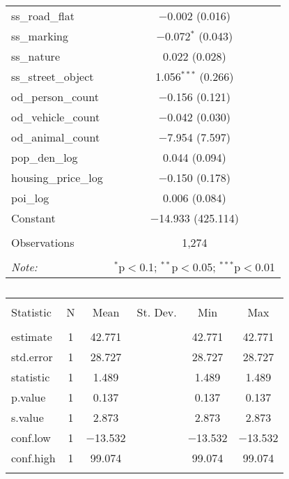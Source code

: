\begin{table}[!htbp]
\begin{tabular}{@{\extracolsep{1pt}}lc}
  ss\_road\_flat & $-$0.002 (0.016) \\ 
  ss\_marking & $-$0.072$^{*}$ (0.043) \\ 
  ss\_nature & 0.022 (0.028) \\ 
  ss\_street\_object & 1.056$^{***}$ (0.266) \\ 
  od\_person\_count & $-$0.156 (0.121) \\ 
  od\_vehicle\_count & $-$0.042 (0.030) \\ 
  od\_animal\_count & $-$7.954 (7.597) \\ 
  pop\_den\_log & 0.044 (0.094) \\ 
  housing\_price\_log & $-$0.150 (0.178) \\ 
  poi\_log & 0.006 (0.084) \\ 
  Constant & $-$14.933 (425.114) \\ 
 \hline \\[-1.8ex] 
Observations & 1,274 \\ 
\hline 
\hline \\[-1.8ex] 
\textit{Note:}  & \multicolumn{1}{r}{$^{*}$p$<$0.1; $^{**}$p$<$0.05; $^{***}$p$<$0.01} \\ 
\end{tabular} 
\end{table} 

\begin{table}[!htbp] \centering 
  \caption{} 
  \label{} 
\small 
\begin{tabular}{@{\extracolsep{1pt}}lccccc} 
\\[-1.8ex]\hline 
\hline \\[-1.8ex] 
Statistic & \multicolumn{1}{c}{N} & \multicolumn{1}{c}{Mean} & \multicolumn{1}{c}{St. Dev.} & \multicolumn{1}{c}{Min} & \multicolumn{1}{c}{Max} \\ 
\hline \\[-1.8ex] 
estimate & 1 & 42.771 &  & 42.771 & 42.771 \\ 
std.error & 1 & 28.727 &  & 28.727 & 28.727 \\ 
statistic & 1 & 1.489 &  & 1.489 & 1.489 \\ 
p.value & 1 & 0.137 &  & 0.137 & 0.137 \\ 
s.value & 1 & 2.873 &  & 2.873 & 2.873 \\ 
conf.low & 1 & $-$13.532 &  & $-$13.532 & $-$13.532 \\ 
conf.high & 1 & 99.074 &  & 99.074 & 99.074 \\ 
\hline \\[-1.8ex] 
\end{tabular} 
\end{table} 

